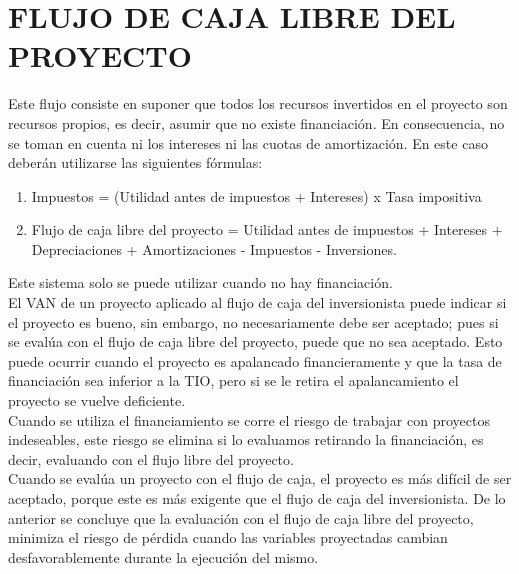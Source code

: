 \section{FLUJO DE CAJA LIBRE DEL PROYECTO}

Este flujo consiste en suponer que todos los recursos invertidos en el proyecto son recursos propios, es decir, asumir que no existe financiación. En consecuencia, no se toman en cuenta ni los intereses ni las cuotas de amortización. En este caso deberán utilizarse las siguientes fórmulas:\\

\begin{enumerate}
	\item Impuestos = (Utilidad antes de impuestos + Intereses) x Tasa impositiva\\
	\item Flujo de caja libre del proyecto = Utilidad antes de impuestos + Intereses + Depreciaciones + Amortizaciones - Impuestos - Inversiones.\\
\end{enumerate}
Este sistema solo se puede utilizar cuando no hay financiación.\\

El VAN de un proyecto aplicado al flujo de caja del inversionista puede indicar si el proyecto es bueno, sin embargo, no necesariamente debe ser aceptado; pues si se evalúa con el flujo de caja libre del proyecto, puede que no sea aceptado. Esto puede ocurrir cuando el proyecto es apalancado financieramente y que la tasa de financiación sea inferior a la TIO, pero si se le retira el apalancamiento el proyecto se vuelve deficiente.\\

Cuando se utiliza el financiamiento se corre el riesgo de trabajar con proyectos indeseables, este riesgo se elimina si lo evaluamos retirando la financiación, es decir, evaluando con el flujo libre del proyecto.\\

Cuando se evalúa un proyecto con el flujo de caja, el proyecto es más difícil de ser aceptado, porque este es más exigente que el flujo de caja del inversionista. De lo anterior se concluye que la evaluación con el flujo de caja libre del proyecto, minimiza el riesgo de pérdida cuando las variables proyectadas cambian desfavorablemente durante la ejecución del mismo.\\\\
\\

